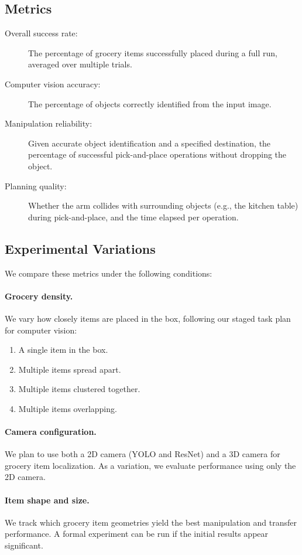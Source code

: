\documentclass{article}
\begin{document}
\subsection*{Metrics}
\begin{description}
    \item[Overall success rate:] The percentage of grocery items successfully placed during a full run, averaged over multiple trials.
    \item[Computer vision accuracy:] The percentage of objects correctly identified from the input image.
    \item[Manipulation reliability:] Given accurate object identification and a specified destination, the percentage of successful pick-and-place operations without dropping the object.
    \item[Planning quality:] Whether the arm collides with surrounding objects (e.g., the kitchen table) during pick-and-place, and the time elapsed per operation.
\end{description}

\subsection*{Experimental Variations}
We compare these metrics under the following conditions:

\paragraph{Grocery density.}
We vary how closely items are placed in the box, following our staged task plan for computer vision:
\begin{enumerate}
    \item A single item in the box.
    \item Multiple items spread apart.
    \item Multiple items clustered together.
    \item Multiple items overlapping.
\end{enumerate}

\paragraph{Camera configuration.}
We plan to use both a 2D camera (YOLO and ResNet) and a 3D camera for grocery item localization. As a variation, we evaluate performance using only the 2D camera.

\paragraph{Item shape and size.}
We track which grocery item geometries yield the best manipulation and transfer performance. A formal experiment can be run if the initial results appear significant.
\end{document}
